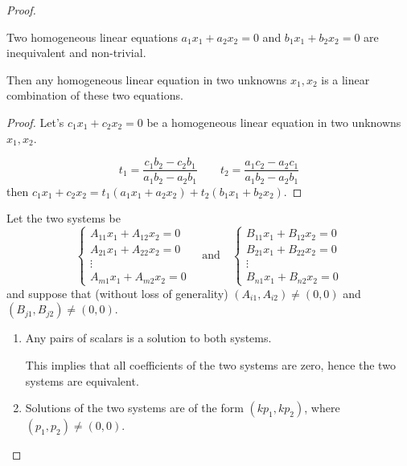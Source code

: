 \begin{proof}
    \begin{lemma}\label{lemma:exercise:linear-combination-of-inequivalent-linear-equations}
        Two homogeneous linear equations $a_{1}x_{1} + a_{2}x_{2} = 0$ and $b_{1}x_{1} + b_{2}x_{2} = 0$ are inequivalent and non-trivial.

        Then any homogeneous linear equation in two unknowns $x_{1}, x_{2}$ is a linear combination of these two equations.
    \end{lemma}
    \begin{proof}
        Let's $c_{1}x_{1} + c_{2}x_{2} = 0$ be a homogeneous linear equation in two unknowns $x_{1}, x_{2}$.

        \[
            t_{1} = \frac{c_{1}b_{2} - c_{2}b_{1}}{a_{1}b_{2} - a_{2}b_{1}}\qquad t_{2} = \frac{a_{1}c_{2} - a_{2}c_{1}}{a_{1}b_{2} - a_{2}b_{1}}
        \]
        then $c_{1}x_{1} + c_{2}x_{2} = t_{1}(a_{1}x_{1} + a_{2}x_{2}) + t_{2}(b_{1}x_{1} + b_{2}x_{2})$.
    \end{proof}

    Let the two systems be
    \[
        \begin{cases}
            A_{11}x_{1} + A_{12}x_{2} = 0 \\
            A_{21}x_{1} + A_{22}x_{2} = 0 \\
            \vdots                        \\
            A_{m1}x_{1} + A_{m2}x_{2} = 0
        \end{cases}
        \quad\text{and}\quad
        \begin{cases}
            B_{11}x_{1} + B_{12}x_{2} = 0 \\
            B_{21}x_{1} + B_{22}x_{2} = 0 \\
            \vdots                        \\
            B_{n1}x_{1} + B_{n2}x_{2} = 0
        \end{cases}
    \]
    and suppose that (without loss of generality) $(A_{i1}, A_{i2})\ne (0, 0)$ and $(B_{j1}, B_{j2})\ne (0, 0)$.

    \begin{enumerate}[label = \textbf{Case \arabic*.}, itemindent=1cm]
        \item Any pairs of scalars is a solution to both systems.

              This implies that all coefficients of the two systems are zero, hence the two systems are equivalent.
        \item Solutions of the two systems are of the form $(kp_{1}, kp_{2})$, where $(p_{1}, p_{2})\ne (0, 0)$.


\end{enumerate}
\end{proof}
